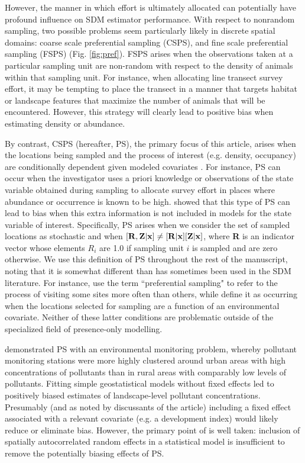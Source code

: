 \documentclass[times,mee,doublespace,]{besauth2}
\begin{document}
However, the manner in which effort is ultimately allocated can potentially have profound influence on SDM estimator performance.  With respect to nonrandom sampling, two possible problems seem particularly likely in discrete spatial domains: coarse scale preferential sampling (CSPS), and fine scale preferential sampling (FSPS) (Fig. \ref{fig:pref}).  FSPS arises when the observations taken at a  particular sampling unit are non-random with respect to the density of animals within that sampling unit.  For instance, when allocating line transect survey effort, it may be tempting to place the transect in a manner that targets habitat or landscape features that maximize the number of animals that will be encountered.  However, this strategy will clearly lead to positive bias when estimating density or abundance.

By contrast, CSPS (hereafter, PS), the primary focus of this article, arises when the locations being sampled and the process of interest (e.g. density, occupancy) are conditionally dependent given modeled covariates \citep{DiggleEtAl2010}.  For instance, PS can occur when the investigator uses a priori knowledge or observations of the state variable obtained during sampling to allocate survey effort in places where abundance or occurrence is known to be high. \citet{DiggleEtAl2010} showed that this type of PS can lead to bias when this extra information is not included in models for the state variable of interest.  Specifically, PS arises when we consider the set of sampled locations as stochastic and when $[{\bf R},{\bf Z} | {\bf x}] \neq [{\bf R}|{\bf x}][{\bf Z}|{\bf x}]$, where \textbf{R} is an indicator vector whose elements $R_i$ are 1.0 if sampling unit $i$ is sampled and are zero otherwise.  We use this definition of PS throughout the rest of the manuscript, noting that it is somewhat different than has sometimes been used in the SDM literature.  For instance, \citet{MerckxEtAl2011} use the term ``preferential sampling" to refer to the process of visiting some sites more often than others, while \citet{ManceurKuhn2014} define it as occurring when the locations selected for sampling are a function of an environmental covariate.  Neither of these latter conditions are problematic outside of the specialized field of presence-only modelling.

\citet{DiggleEtAl2010} demonstrated PS with an environmental monitoring problem, whereby pollutant monitoring stations were more highly clustered around urban areas with high concentrations of pollutants than in rural areas with comparably low levels of pollutants.  Fitting simple geostatistical models without fixed effects led to positively biased estimates of landscape-level pollutant concentrations.  Presumably (and as noted by discussants of the article) including a fixed effect associated with a relevant covariate (e.g. a development index) would likely reduce or eliminate bias.  However, the primary point of \citet{DiggleEtAl2010} is well taken: inclusion of spatially autocorrelated random effects in a statistical model is insufficient to remove the potentially biasing effects of PS.
\end{document}
